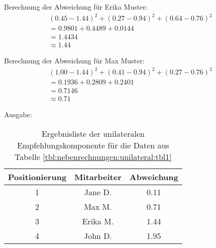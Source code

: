 Berechnung der Abweichung für Erika Muster:
\begin{gather}
	\nonumber (0.45-1.44)^2 + (0.27-0.94)^2 + (0.64-0.76)^2\\
	\nonumber = 0.9801 + 0.4489 + 0.0144\\
	\nonumber = 1.4434\\
	\approx 1.44
	\label{frml:nebenrechnungen:unilateral:erika}
\end{gather}

Berechnung der Abweichung für Max Muster:
\begin{gather}
	\nonumber (1.00-1.44)^2 + (0.41-0.94)^2 + (0.27-0.76)^2\\
	\nonumber = 0.1936 + 0.2809 + 0.2401\\
	\nonumber = 0.7146\\
	\approx 0.71
	\label{frml:nebenrechnungen:unilateral:max}
\end{gather}

Ausgabe:
\begin{table}[h]
	\centering
	\begin{tabular}{c|c|c}
		Positionierung & Mitarbeiter & Abweichung\\
		\hline
		1 & Jane D.  & 0.11\\
		2 & Max M.   & 0.71\\
		3 & Erika M. & 1.44\\
		4 & John D.  & 1.95
	\end{tabular}
	\caption{Ergebnisliste der unilateralen Empfehlungskomponente für die Daten aus Tabelle \ref{tbl:nebenrechnungen:unilateral:tbl1}}
	\label{tbl:nebenrechnungen:unilateral:ausgabe}
\end{table}